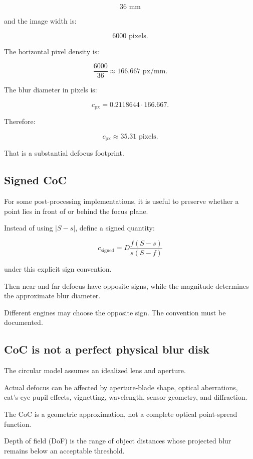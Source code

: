 \[ 36\text{ mm} \]

and the image width is:

\[ 6000\text{ pixels}. \]

The horizontal pixel density is:

\[ \frac{6000}{36} \approx166.667\text{ px/mm}. \]

The blur diameter in pixels is:

\[ c_{\mathrm{px}} = 0.2118644 \cdot166.667. \]

Therefore:

\[ \boxed{ c_{\mathrm{px}}\approx35.31\text{ pixels}. } \]

That is a substantial defocus footprint.

\subsection{Signed CoC}\label{02-foundations-ii-ch036-signed-coc}

For some post-processing implementations, it is useful to preserve whether a point lies in front of or behind the focus plane.

Instead of using \(|S-s|\), define a signed quantity:

\[ \boxed{ c_{\mathrm{signed}} = D\frac{f(S-s)}{s(S-f)} } \]

under this explicit sign convention.

Then near and far defocus have opposite signs, while the magnitude determines the approximate blur diameter.

Different engines may choose the opposite sign. The convention must be documented.

\subsection{CoC is not a perfect physical blur disk}\label{02-foundations-ii-ch036-coc-is-not-a-perfect-physical-blur-disk}

The circular model assumes an idealized lens and aperture.

Actual defocus can be affected by aperture-blade shape, optical aberrations, cat's-eye pupil effects, vignetting, wavelength, sensor geometry, and diffraction.

The CoC is a geometric approximation, not a complete optical point-spread function.

Depth of field (DoF) is the range of object distances whose projected blur remains below an acceptable threshold.

